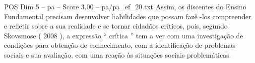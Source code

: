 \begin{textsample}{POS Dim 5 – pa – Score 3.00 – pa/pa\_ef\_20.txt}
Assim, os discentes do Ensino Fundamental precisam desenvolver habilidades que possam fazê -los compreender e refletir sobre a sua realidade e se tornar cidadãos críticos, pois, segundo Skovsmose ( 2008 ), a expressão “ crítica ” tem a ver com uma investigação de condições para obtenção de conhecimento, com a identificação de problemas sociais e sua avaliação, com uma reação às situações sociais problemáticas.

\end{textsample}
